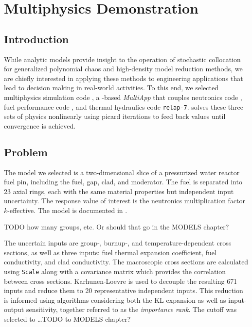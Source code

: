 
\chapter{Multiphysics Demonstration} %

\label{ch:mammoth} %



\section{Introduction}
While analytic models provide insight to the operation of stochastic collocation for generalized polynomial chaos and high-density
model reduction methods, we are chiefly interested in applying these methods to engineering applications that lead to
decision making in real-world activities.  To this end, we selected multiphysics simulation code \mammoth{}, a \moose{}-based
\emph{MultiApp} that couples neutronics code \rattlesnake{}, fuel performance code \bison{}, and thermal hydraulics code
\texttt{relap-7}.  \mammoth{} solves these three sets of physics nonlinearly using picard iterations to feed back values until
convergence is achieved.

\section{Problem}
The model we selected is a two-dimensional slice of a pressurized water reactor fuel pin, including the fuel, gap, clad, and
moderator.  The fuel is separated into 23 axial rings, each with the same material properties but independent input uncertainty.
The response value of interest is the neutronics multiplication factor $k$-effective.  The model is documented
in \cite{physormammoth}.

TODO how many groups, etc.  Or should that go in the MODELS chapter?

The uncertain inputs are group-, burnup-, and temperature-dependent cross sections, as well as three \bison{}
inputs: fuel thermal expansion coefficient, fuel conductivity, and clad conductivity.
The macroscopic cross sections are calculated using \texttt{Scale} \cite{scale} along with a covariance matrix which provides
the correlation between cross sections.  Karhunen-Loevre \cite{karhunen} is used to decouple the resulting 671 inputs and
reduce them to 20 representative independent inputs.  This reduction is informed using \raven{} algorithms
considering both the KL expansion as well as input-output sensitivity, together referred to as the
\emph{importance rank}.  The cutoff was selected to \ldots TODO to MODELS chapter?

